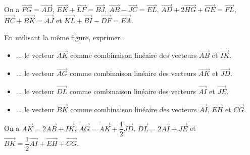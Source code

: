 \documentclass[11pt,fleqn, openany]{book} %
\begin{document}
\begin{solution}On a  $\overrightarrow{FG} = \overrightarrow{AD}$, $\overrightarrow{EK}+\overrightarrow{LF}= \overrightarrow{BJ}$, $\overrightarrow{AB}- \overrightarrow{JC} = \overrightarrow{EL}$,  $\overrightarrow{AD}+2\overrightarrow{HG}+\overrightarrow{GE}=\overrightarrow{FL}$, $\overrightarrow{HC}+\overrightarrow{BK} = \overrightarrow{AJ}$ et $\overrightarrow{KL} + \overrightarrow{BI} - \overrightarrow{DF} = \overrightarrow{EA}$.\end{solution}

\begin{exercise}
En utilisant la même figure, exprimer...
\begin{itemize}
\item ... le vecteur $\overrightarrow{AK}$ comme combinaison linéaire des vecteurs $\overrightarrow{AB}$ et $\overrightarrow{IK}$.
\item ... le vecteur $\overrightarrow{AG}$ comme combinaison linéaire des vecteurs $\overrightarrow{AK}$ et $\overrightarrow{JD}$.
\item ... le vecteur $\overrightarrow{DL}$ comme combinaison linéaire des vecteurs $\overrightarrow{AI}$ et $\overrightarrow{JE}$.
\item ... le vecteur $\overrightarrow{BK}$ comme combinaison linéaire des vecteurs $\overrightarrow{AI}$, $\overrightarrow{EH}$ et $\overrightarrow{CG}$.
\end{itemize}\end{exercise}

\begin{solution}On a $\overrightarrow{AK}=2\overrightarrow{AB}+\overrightarrow{IK}$, $\overrightarrow{AG}=\overrightarrow{AK}+\dfrac{1}{2}\overrightarrow{JD}$, $\overrightarrow{DL}=2\overrightarrow{AI}+\overrightarrow{JE}$ et $\overrightarrow{BK}=\dfrac{1}{2}\overrightarrow{AI}+\overrightarrow{EH}+\overrightarrow{CG}$.\end{solution}
\end{document}

